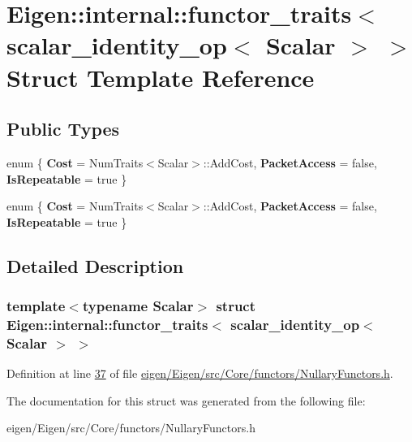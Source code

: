 \hypertarget{struct_eigen_1_1internal_1_1functor__traits_3_01scalar__identity__op_3_01_scalar_01_4_01_4}{}\section{Eigen\+:\+:internal\+:\+:functor\+\_\+traits$<$ scalar\+\_\+identity\+\_\+op$<$ Scalar $>$ $>$ Struct Template Reference}
\label{struct_eigen_1_1internal_1_1functor__traits_3_01scalar__identity__op_3_01_scalar_01_4_01_4}
\subsection*{Public Types}
\begin{DoxyCompactItemize}
\item 
\mbox{\label{struct_eigen_1_1internal_1_1functor__traits_3_01scalar__identity__op_3_01_scalar_01_4_01_4_aa0e236d02d9a6bad39c8e4caed12ed9c}} 
enum \{ {\bfseries Cost} = Num\+Traits$<$Scalar$>$\+:\+:Add\+Cost, 
{\bfseries Packet\+Access} = false, 
{\bfseries Is\+Repeatable} = true
 \}
\item 
\mbox{\label{struct_eigen_1_1internal_1_1functor__traits_3_01scalar__identity__op_3_01_scalar_01_4_01_4_a2e251a8a6518da2011baf064533068d5}} 
enum \{ {\bfseries Cost} = Num\+Traits$<$Scalar$>$\+:\+:Add\+Cost, 
{\bfseries Packet\+Access} = false, 
{\bfseries Is\+Repeatable} = true
 \}
\end{DoxyCompactItemize}


\subsection{Detailed Description}
\subsubsection*{template$<$typename Scalar$>$\newline
struct Eigen\+::internal\+::functor\+\_\+traits$<$ scalar\+\_\+identity\+\_\+op$<$ Scalar $>$ $>$}



Definition at line \hyperlink{eigen_2_eigen_2src_2_core_2functors_2_nullary_functors_8h_source_l00037}{37} of file \hyperlink{eigen_2_eigen_2src_2_core_2functors_2_nullary_functors_8h_source}{eigen/\+Eigen/src/\+Core/functors/\+Nullary\+Functors.\+h}.



The documentation for this struct was generated from the following file\+:\begin{DoxyCompactItemize}
\item 
eigen/\+Eigen/src/\+Core/functors/\+Nullary\+Functors.\+h\end{DoxyCompactItemize}
